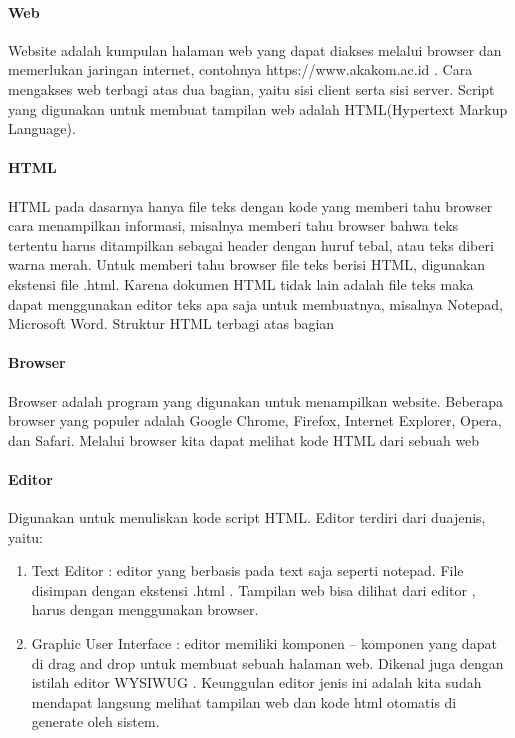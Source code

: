 \documentclass[a4paper,12pt]{article}
\begin{document}
\paragraph{Web\\}
Website adalah kumpulan halaman web yang dapat diakses melalui browser dan
memerlukan jaringan internet, contohnya https://www.akakom.ac.id . Cara mengakses
web terbagi atas dua bagian, yaitu sisi client serta sisi server. Script yang digunakan
untuk membuat tampilan web adalah HTML(Hypertext Markup Language).

\paragraph{HTML\\}
HTML pada dasarnya hanya file teks dengan kode yang memberi tahu browser cara
menampilkan informasi, misalnya memberi tahu browser bahwa teks tertentu harus
ditampilkan sebagai header dengan huruf tebal, atau teks diberi warna merah. Untuk
memberi tahu browser file teks berisi HTML, digunakan ekstensi file .html. Karena
dokumen HTML tidak lain adalah file teks maka dapat menggunakan editor teks apa
saja untuk membuatnya, misalnya Notepad, Microsoft Word. Struktur HTML terbagi
atas bagian

\paragraph{Browser\\}
Browser adalah program yang digunakan untuk menampilkan website. Beberapa
browser yang populer adalah Google Chrome, Firefox, Internet Explorer, Opera, dan
Safari. Melalui browser kita dapat melihat kode HTML dari sebuah web

\paragraph{Editor\\}
Digunakan untuk menuliskan kode script HTML. Editor terdiri dari duajenis, yaitu:\\
\begin{enumerate}[label=\alph*.]
    \item Text Editor : editor yang berbasis pada text saja seperti notepad. File
disimpan dengan ekstensi .html . Tampilan web bisa dilihat dari editor ,
harus dengan menggunakan browser. 
    \item Graphic User Interface : editor memiliki komponen – komponen yang dapat
di drag and drop untuk membuat sebuah halaman web. Dikenal juga
dengan istilah editor WYSIWUG . Keunggulan editor jenis ini adalah kita
sudah mendapat langsung melihat tampilan web dan kode html otomatis di
generate oleh sistem.
\end{enumerate}
\end{document}
